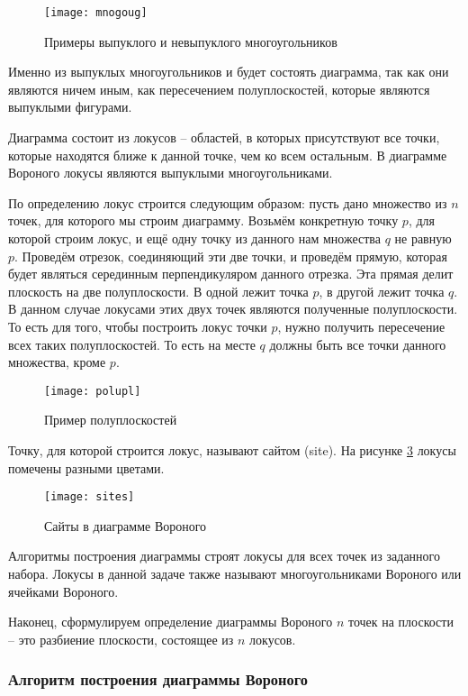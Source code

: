 \begin{figure}[h]
	\centering\texttt{[image: mnogoug]}
	\caption{Примеры выпуклого и невыпуклого многоугольников}
	\label{fig:mnogoug}
\end{figure}

Именно из выпуклых многоугольников и будет состоять диаграмма, так как они являются ничем иным, как пересечением полуплоскостей, которые являются выпуклыми фигурами.

Диаграмма состоит из локусов -- областей, в которых присутствуют все точки, которые находятся ближе к данной точке, чем ко всем остальным. В диаграмме Вороного локусы являются выпуклыми многоугольниками.

По определению локус строится следующим образом: пусть дано множество из $n$ точек, для которого мы строим диаграмму. Возьмём конкретную точку $p$, для которой строим локус, и ещё одну точку из данного нам множества $q$ не равную $p$. Проведём отрезок, соединяющий эти две точки, и проведём прямую, которая будет являться серединным перпендикуляром данного отрезка. Эта прямая делит плоскость на две полуплоскости. В одной лежит точка $p$, в другой лежит точка $q$. В данном случае локусами этих двух точек являются полученные полуплоскости. То есть для того, чтобы построить локус точки $p$, нужно получить пересечение всех таких полуплоскостей. То есть на месте $q$ должны быть все точки данного множества, кроме $p$.

\begin{figure}[h]
	\centering\texttt{[image: polupl]}
	\caption{Пример полуплоскостей}
	\label{fig:polupl}
\end{figure}

Точку, для которой строится локус, называют сайтом (site). На рисунке \ref{fig:sites} локусы помечены разными цветами.

\begin{figure}[h]
	\centering\texttt{[image: sites]}
	\caption{Сайты в диаграмме Вороного}
	\label{fig:sites}
\end{figure}

Алгоритмы построения диаграммы строят локусы для всех точек из заданного набора. Локусы в данной задаче также называют многоугольниками Вороного или ячейками Вороного. 

Наконец, сформулируем определение диаграммы Вороного $n$ точек на плоскости -- это разбиение плоскости, состоящее из $n$ локусов. 

\subsubsection{Алгоритм построения диаграммы Вороного}

